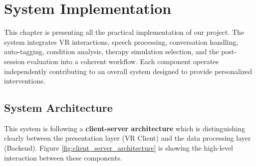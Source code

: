 \chapter{System Implementation}
\label{chap:implementation}

This chapter is presenting all the practical implementation of our project. The system integrates VR interactions, speech processing, conversation handling, auto-tagging, condition analysis, therapy simulation selection, and the post-session evaluation into a coherent workflow. Each component operates independently contributing to an overall system designed to provide personalized interventions.

\section{System Architecture}
This system is following a \textbf{client-server architecture} which is distinguishing clearly between the presentation layer (VR Client) and the data processing layer (Backend). Figure \ref{fig:client_server_architecture} is showing the high-level interaction between these components.

